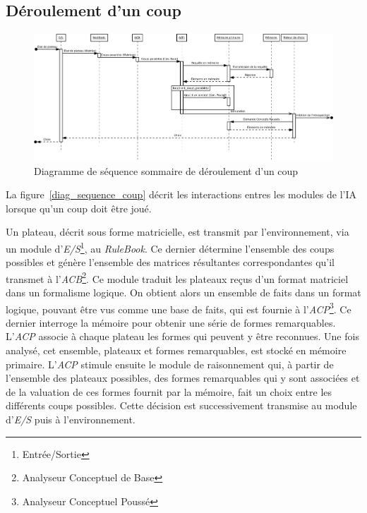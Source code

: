 \subsection{Déroulement d'un coup}
\label{deroulement_dun_coup}

\begin{figure}[p]
\centering
\includegraphics[width=0.9\textheight,angle=90]{files/analyse/sequence}
\caption{Diagramme de séquence sommaire de déroulement d'un coup}
\label{diag_sequence_coup}
\end{figure}

La figure~\vref{diag_sequence_coup} décrit les interactions entres les modules de l'IA lorsque qu'un coup doit être joué.

Un plateau, décrit sous forme matricielle, est transmit par l'environnement, via un module d'\emph{E/S}\footnote{Entrée/Sortie}, au \emph{RuleBook}. Ce dernier détermine l'ensemble des coups possibles et génère l'ensemble des matrices résultantes correspondantes qu'il transmet à l'\emph{ACB}\footnote{Analyseur Conceptuel de Base}. Ce module traduit les plateaux reçus d'un format matriciel dans un formalisme logique. On obtient alors un ensemble de faits dans un format logique, pouvant être vus comme une base de faits, qui est fournie à l'\emph{ACP}\footnote{Analyseur Conceptuel Poussé}. Ce dernier interroge la mémoire pour obtenir une série de formes remarquables. L'\emph{ACP} associe à chaque plateau les formes qui peuvent y être reconnues. Une fois analysé, cet ensemble, plateaux et formes remarquables, est stocké en mémoire primaire. L'\emph{ACP} stimule ensuite le module de raisonnement qui, à partir de l'ensemble des plateaux possibles, des formes remarquables qui y sont associées et de la valuation de ces formes fournit par la mémoire, fait un choix entre les différents coups possibles. Cette décision est successivement transmise au module d'\emph{E/S} puis à l'environnement.
